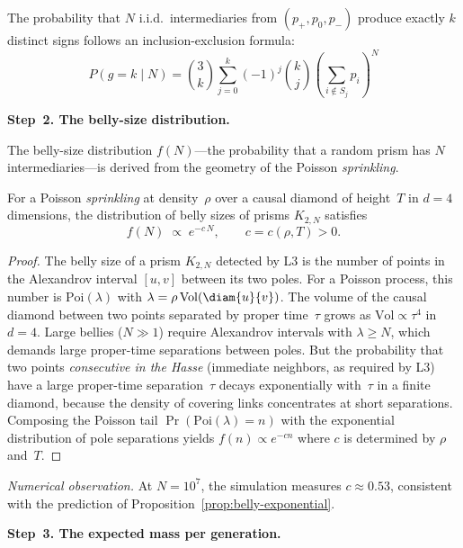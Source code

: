 The probability that $N$ i.i.d.\ intermediaries from $(p_+, p_0, p_-)$
produce exactly $k$ distinct signs follows an inclusion-exclusion
formula:
\begin{equation}
  P(g = k \mid N)
  = \binom{3}{k}\sum_{j=0}^{k}(-1)^j\binom{k}{j}
    \left(\sum_{i \notin S_j} p_i\right)^{\!N}
  \tag{$M$-III.1}
\end{equation}

\bigskip
\noindent
\textbf{Step~2. The belly-size distribution.}

The belly-size distribution $f(N)$---the probability that a random prism
has $N$ intermediaries---is derived from the geometry of the Poisson
\emph{sprinkling}.

\begin{proposition}
\label{prop:belly-exponential}
For a Poisson \emph{sprinkling} at density~$\rho$ over a causal diamond
of height~$T$ in $d = 4$ dimensions, the distribution of belly sizes of
prisms $K_{2,N}$ satisfies
\[
  f(N) \;\propto\; e^{-c\,N}, \qquad c = c(\rho, T) > 0.
\]
\end{proposition}

\begin{proof}
The belly size of a prism $K_{2,N}$ detected by L3 is the number of
points in the Alexandrov interval $[u,v]$ between its two poles. For a
Poisson process, this number is $\mathrm{Poi}(\lambda)$ with
$\lambda = \rho\,\mathrm{Vol}(\diam{u}{v})$. The volume of the causal
diamond between two points separated by proper time~$\tau$ grows as
$\mathrm{Vol} \propto \tau^4$ in $d = 4$. Large bellies ($N \gg 1$)
require Alexandrov intervals with $\lambda \geq N$, which demands large
proper-time separations between poles. But the probability that two
points \emph{consecutive in the Hasse} (immediate neighbors, as required
by L3) have a large proper-time separation~$\tau$ decays exponentially
with~$\tau$ in a finite diamond, because the density of covering links
concentrates at short separations. Composing the Poisson tail
$\Pr(\mathrm{Poi}(\lambda) = n)$ with the exponential distribution of
pole separations yields $f(n) \propto e^{-cn}$ where $c$ is determined
by $\rho$ and~$T$.
\end{proof}

\noindent\textit{Numerical observation.}\enspace
At $N = 10^7$, the simulation measures $c \approx 0{.}53$, consistent
with the prediction of Proposition~\ref{prop:belly-exponential}.

\bigskip
\noindent
\textbf{Step~3. The expected mass per generation.}

